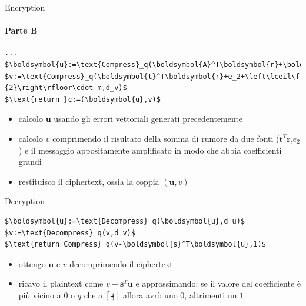\begin{frame}[fragile]{Encryption}
    \framesubtitle{Parte B}
    \begin{minipage}{0.45\linewidth}
        \begin{lstlisting}[title={Kyber.CPA.Enc(pk,m):},mathescape=true,firstnumber=4]
...
$\boldsymbol{u}:=\text{Compress}_q(\boldsymbol{A}^T\boldsymbol{r}+\boldsymbol{e_1},d_u)$
$v:=\text{Compress}_q(\boldsymbol{t}^T\boldsymbol{r}+e_2+\left\lceil\frac{q}{2}\right\rfloor\cdot m,d_v)$
$\text{return }c:=(\boldsymbol{u},v)$
        \end{lstlisting}
    \end{minipage}\hfill
    \begin{minipage}{0.5\linewidth}
        \begin{itemize}%
            \item calcolo $\boldsymbol{u}$ usando gli errori vettoriali generati precedentemente
            \item calcolo $v$ comprimendo il risultato della somma di rumore da due fonti ($\boldsymbol{t}^T\boldsymbol{r}$,$e_2$) e il messaggio appositamente amplificato in modo che abbia coefficienti grandi
            \item restituisco il ciphertext, ossia la coppia $(\boldsymbol{u},v)$
        \end{itemize}
    \end{minipage}
\end{frame}

\begin{frame}[fragile]{Decryption}

    \vspace{\baselineskip}

    \begin{minipage}{0.35\linewidth}
        \begin{lstlisting}[title={Kyber.CPA.Dec(sk,c):},mathescape=true]
$\boldsymbol{u}:=\text{Decompress}_q(\boldsymbol{u},d_u)$
$v:=\text{Decompress}_q(v,d_v)$
$\text{return Compress}_q(v-\boldsymbol{s}^T\boldsymbol{u},1)$
        \end{lstlisting}
    \end{minipage}\hfill
    \begin{minipage}{0.6\linewidth}
        \begin{itemize}%
            \item ottengo $\boldsymbol{u}$ e $v$ decomprimendo il ciphertext
            \item ricavo il plaintext come $v-\boldsymbol{s}^T\boldsymbol{u}$ e approssimando: se il valore del coefficiente è più vicino a $0$ o $q$ che a $\left\lceil\frac{q}{2}\right\rfloor$ allora avrò uno $0$, altrimenti un $1$
        \end{itemize}
    \end{minipage}

\end{frame}

